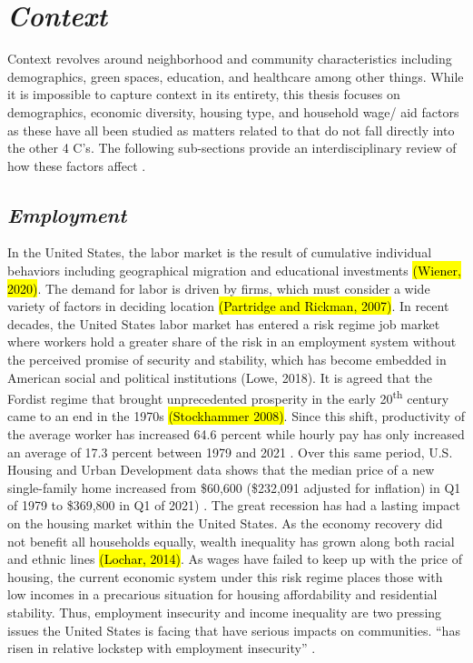 \section{\textit{Context}}

Context revolves around neighborhood and community characteristics including demographics, green spaces, education, and healthcare among other things. While it is impossible to capture context in its entirety, this thesis focuses on demographics, economic diversity, housing type, and household wage/ aid factors as these have all been studied as matters related to \hs that do not fall directly into the other 4 C’s. The following sub-sections provide an interdisciplinary review of how these factors affect \hs.  

\subsection{\textit{Employment}}

In the United States, the labor market is the result of cumulative individual behaviors including geographical migration and educational investments \hl{(Wiener, 2020)}. The demand for labor is driven by firms, which must consider a wide variety of factors in deciding location \hl{(Partridge and Rickman, 2007)}. In recent decades, the United States labor market has entered a risk regime job market where workers hold a greater share of the risk in an employment system without the perceived promise of security and stability, which has become embedded in American social and political institutions (Lowe, 2018). It is agreed that the Fordist regime that brought unprecedented prosperity in the early 20\textsuperscript{th} century came to an end in the 1970s \hl{(Stockhammer 2008)}. Since this shift, productivity of the average worker has increased 64.6 percent while hourly pay has only increased an average of 17.3 percent between 1979 and 2021 \citep{noauthor_productivity-pay_2022}. Over this same period, U.S. Housing and Urban Development data shows that the median price of a new single-family home increased from \$60,600 (\$232,091 adjusted for inflation) in Q1 of 1979 to \$369,800 in Q1 of 2021) \citep{us_census_bureau_median_1963}. The great recession has had a lasting impact on the housing market within the United States. As the economy recovery did not benefit all households equally, wealth inequality has grown along both racial and ethnic lines \hl{(Lochar, 2014)}. As wages have failed to keep up with the price of housing, the current economic system under this risk regime places those with low incomes in a precarious situation for housing affordability and residential stability. Thus, employment insecurity and income inequality are two pressing issues the United States is facing that have serious impacts on communities. “\hs has risen in relative lockstep with employment insecurity” \citep[48]{desmond_housing_2016-1}. 

